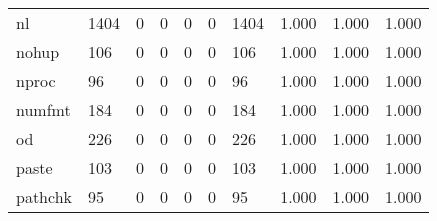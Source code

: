 \begin{longtable}{lp{1.3cm}p{1.3cm}p{1.3cm}p{1.3cm}p{1.3cm}p{1.3cm}p{1.3cm}p{1.3cm}p{1.3cm}}
nl        &                   1404 &                                  0 &                                 0 &                                0 &                                 0 &                            1404 &                                1.000 &                                  1.000 &                                1.000 \\
nohup     &                    106 &                                  0 &                                 0 &                                0 &                                 0 &                             106 &                                1.000 &                                  1.000 &                                1.000 \\
nproc     &                     96 &                                  0 &                                 0 &                                0 &                                 0 &                              96 &                                1.000 &                                  1.000 &                                1.000 \\
numfmt    &                    184 &                                  0 &                                 0 &                                0 &                                 0 &                             184 &                                1.000 &                                  1.000 &                                1.000 \\
od        &                    226 &                                  0 &                                 0 &                                0 &                                 0 &                             226 &                                1.000 &                                  1.000 &                                1.000 \\
paste     &                    103 &                                  0 &                                 0 &                                0 &                                 0 &                             103 &                                1.000 &                                  1.000 &                                1.000 \\
pathchk   &                     95 &                                  0 &                                 0 &                                0 &                                 0 &                              95 &                                1.000 &                                  1.000 &                                1.000 \\

\end{longtable}

